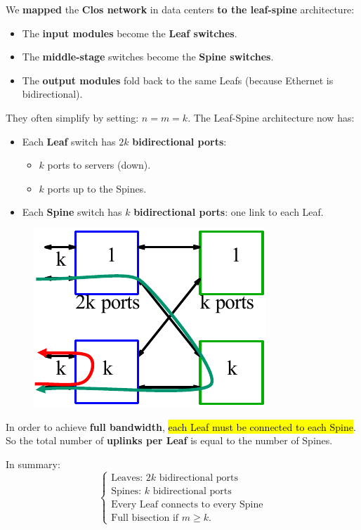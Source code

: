 We \textbf{mapped} the \textbf{Clos network} in data centers \textbf{to the leaf-spine} architecture:
\begin{itemize}
    \item The \textbf{input modules} become the \textbf{Leaf switches}.
    \item The \textbf{middle-stage} switches become the \textbf{Spine switches}.
    \item The \textbf{output modules} fold back to the same Leafs (because Ethernet is bidirectional).
\end{itemize}
They often simplify by setting: $n = m = k$. The Leaf-Spine architecture now has:
\begin{itemize}
    \item Each \textbf{Leaf} switch has $2k$ \textbf{bidirectional ports}:
    \begin{itemize}
        \item $k$ ports to servers (down).
        \item $k$ ports up to the Spines.
    \end{itemize}
    \item Each \textbf{Spine} switch has $k$ \textbf{bidirectional ports}: one link to each Leaf.
\end{itemize}
\begin{figure}[!htp]
    \centering
    \includegraphics[width=.28\textwidth]{img/networking-5.pdf}
\end{figure}
In order to achieve \textbf{full bandwidth}, \hl{each Leaf must be connected to each Spine}. So the total number of \textbf{uplinks per Leaf} is equal to the number of Spines.

\highspace
In summary:
\begin{equation*}
    \begin{cases}
        \text{Leaves: $2k$ bidirectional ports} \\
        \text{Spines: $k$ bidirectional ports} \\
        \text{Every Leaf connects to every Spine} \\
        \text{Full bisection if $m \ge k$.}
    \end{cases}
\end{equation*}

